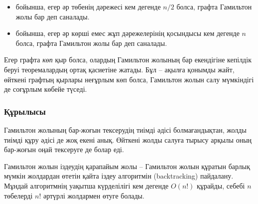 \begin{itemize}
\item
{}
 бойынша, %
егер әр төбенің дәрежесі кем дегенде $n/2$ болса,
графта Гамильтон жолы бар деп саналады.
\item
{}
 бойынша, %
егер әр көрші емес жұп дәрежелерінің
қосындысы кем дегенде $n$ болса,
графта Гамильтон жолы бар деп саналады.
\end{itemize}

Егер графта \emph{көп} қыр болса,
олардың Гамильтон жолының бар екендігіне кепілдік беруі теоремалардың ортақ қасиетіне жатады.
Бұл -- ақылға қонымды жайт, өйткені графтың қырлары неғұрлым көп болса, Гамильтон жолын салу мүмкіндігі де соғұрлым көбейе түседі.

\subsubsection{Құрылысы}

Гамильтон жолының бар-жоғын тексерудің тиімді әдісі 
болмағандықтан, жолды тиімді құру әдісі де жоқ екені анық.
Өйткені жолды салуға тырысу арқылы оның  
бар-жоғын оңай тексеруге де болар еді.

Гамильтон жолын іздеудің қарапайым жолы --
Гамильтон жолын құратын барлық мүмкін жолдардан өтетін 
қайта іздеу алгоритмін (backtracking) пайдалану. 
Мұндай алгоритмнің уақытша күрделілігі кем дегенде 
$O(n!)$ құрайды, себебі $n$ төбелерді $n!$ әртүрлі жолдармен
өтуге болады.

